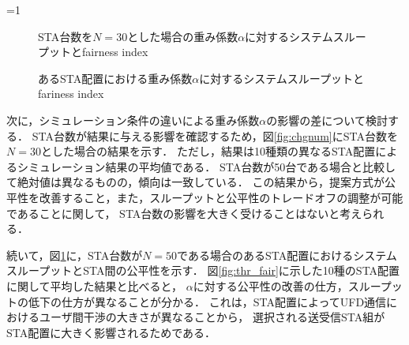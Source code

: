 \documentclass[technicalreport]{ieicej}
\newcounter{flagFig}
\begin{document}
			\par
			\ifnum\value{flagFig}=1 {\begin{figure}[t]
				\centering
					\caption{STA台数を$N=30$とした場合の重み係数$\alpha$に対するシステムスループットとfairness index}
					\label{fig:chgnum}

					\caption{あるSTA配置における重み係数$\alpha$に対するシステムスループットとfariness index}
					\label{fig:chgtopology}
			\end{figure}}\fi
			次に，シミュレーション条件の違いによる重み係数$\alpha$の影響の差について検討する．
			STA台数が結果に与える影響を確認するため，図\ref{fig:chgnum}にSTA台数を$N=30$とした場合の結果を示す．
			ただし，結果は10種類の異なるSTA配置によるシミュレーション結果の平均値である．
			STA台数が50台である場合と比較して絶対値は異なるものの，傾向は一致している．
			この結果から，提案方式が公平性を改善すること，また，スループットと公平性のトレードオフの調整が可能であることに関して，
			STA台数の影響を大きく受けることはないと考えられる．
			\par
			続いて，図\ref{fig:chgtopology}に，STA台数が$N=50$である場合のあるSTA配置におけるシステムスループットとSTA間の公平性を示す．
			図\ref{fig:thr_fair}に示した10種のSTA配置に関して平均した結果と比べると，
			$\alpha$に対する公平性の改善の仕方，スループットの低下の仕方が異なることが分かる．
			これは，STA配置によってUFD通信におけるユーザ間干渉の大きさが異なることから，
			選択される送受信STA組がSTA配置に大きく影響されるためである．
\end{document}
